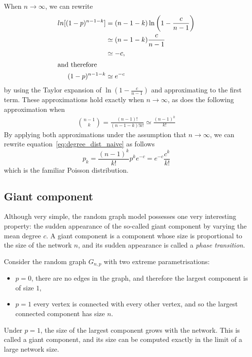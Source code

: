 When $n\rightarrow \infty$, we can rewrite
\begin{align}
	ln[(1-p)^{n-1-k}] &= (n-1-k) \ln\left( 1-\frac{c}{n-1} \right)\\
                      &\simeq (n-1-k) \frac{c}{n-1}\\
                      &\simeq -c,\\
\intertext{\noindent and therefore }
    (1-p) ^{n-1-k} & \simeq e^{-c}
\end{align}
\noindent by using the Taylor expansion of $\ln\left(1-\frac{c}{n-1}\right)$ and approximating to the first term.
These approximations hold exactly when $n\rightarrow \infty$, as does the following approximation when
\begin{align}
    \binom{n-1}{k} = \frac{(n-1)!}{(n-1-k)! k!} \simeq \frac{(n-1)^k}{k!}
\end{align}
By applying both approximations under the assumption that $n \rightarrow \infty$, we can rewrite equation~\vref{eq:degree_dist_naive} as follows
\begin{equation}
	p_k = \frac{(n-1)^k}{k!} p^k e^{-c} = e^{-c} \frac{c^k}{k!}
\end{equation}
which is the familiar Poisson distribution.



\subsection{Giant component} %
\label{sub:giant_component}

Although very simple, the random graph model possesses one very interesting property: the sudden appearance of the so-called giant component by varying the mean degree $c$.
A giant component is a component whose size is proportional to the size of the network $n$, and its sudden appearance is called a \textit{phase transition}.

Consider the random graph $G_{n, p}$ with two extreme parametrisations:
\begin{itemize}
	\item[] $p = 0$, there are no edges in the graph, and therefore the largest component is of size $1$,
	\item[] $p = 1$ every vertex is connected with every other vertex, and so the largest connected component has size $n$. 
\end{itemize}
Under $p=1$, the size of the largest component grows with the network.
This is called a giant component, and its size can be computed exactly in the limit of a large network size.

